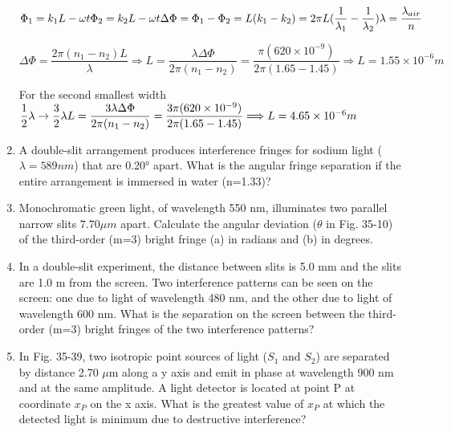 \documentclass[fleqn]{article}
\begin{document}
\begin{enumerate}
    \textcolor{hwColor}{
      $
        \Phi_1=k_1L-\omega t \\
        \Phi_2=k_2L-\omega t \\
        \Delta\Phi=\Phi_1-\Phi_2=L(k_1-k_2)=2\pi L(\dfrac{1}{\lambda_1}-\dfrac{1}{\lambda_2}) \\
        \lambda=\dfrac{\lambda_{air}}{n}
      $
    }

    \textcolor{hwColor}{
      $
        \Delta \Phi=\dfrac{2\pi(n_1-n_2)L}{\lambda} \Longrightarrow L=\dfrac{\lambda \Delta \Phi}{2\pi(n_1-n_2)}=\dfrac{\pi(620\times 10^{-9})}{2\pi (1.65-1.45)} \Longrightarrow L=1.55 \times 10^{-6} m
      $
    }

    \bigbreak 

    \textcolor{hwColor}{
      For the second smallest width 
      $
        \dfrac{1}{2}\lambda \rightarrow \dfrac{3}{2}\lambda \\
        L=\dfrac{3\lambda \Delta \Phi}{2\pi(n_1-n_2)}=\dfrac{3\pi (620 \times 10^{-9})}{2\pi (1.65-1.45)} \Longrightarrow L=4.65 \times 10^{-6} m
      $
    }

    \item A double-slit arrangement produces interference fringes for sodium light ($\lambda=589 nm$) that are 0.20° apart. What is the angular fringe separation if the entire arrangement is immersed in water (n=1.33)?

    \item Monochromatic green light, of wavelength 550 nm, illuminates two parallel narrow slits $7.70 \mu m$ apart. Calculate the angular deviation ($\theta$ in Fig. 35-10) of the third-order (m=3) bright fringe (a) in radians and (b) in degrees.

    \item In a double-slit experiment, the distance between slits is 5.0 mm and the slits are 1.0 m from the screen. Two interference patterns can be seen on the screen: one due to light of wavelength 480 nm, and the other due to light of wavelength 600 nm. What is the separation on the screen between the third-order (m=3) bright fringes of the two interference patterns?

    \item In Fig. 35-39, two isotropic point sources of light ($S_1$ and $S_2$) are separated by distance 2.70 $\mu$m along a y axis and emit in phase at wavelength 900 nm and at the same amplitude. A light detector is located at point P at coordinate $x_P$ on the x axis. What is the greatest value of $x_P$ at which the detected light is minimum due to destructive interference?


\end{enumerate}
\end{document}
